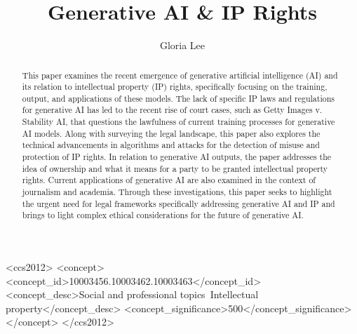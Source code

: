 \documentclass[manuscript,screen]{acmart}
\begin{document}
\title{Generative AI \& IP Rights}

\author{Gloria Lee}


\renewcommand{\shortauthors}{Lee}

\begin{abstract}
  This paper examines the recent emergence of generative artificial intelligence (AI) and its relation to intellectual property (IP) rights, specifically focusing on the training, output, and applications of these models. The lack of specific IP laws and regulations for generative AI has led to the recent rise of court cases, such as Getty Images v. Stability AI, that questions the lawfulness of current training processes for generative AI models. Along with surveying the legal landscape, this paper also explores the technical advancements in algorithms and attacks for the detection of misuse and protection of IP rights. In relation to generative AI outputs, the paper addresses the idea of ownership and what it means for a party to be granted intellectual property rights. Current applications of generative AI are also examined in the context of journalism and academia. Through these investigations, this paper seeks to highlight the urgent need for legal frameworks specifically addressing generative AI and IP and brings to light complex ethical considerations for the future of generative AI. 
\end{abstract}

\begin{CCSXML}
<ccs2012>
  <concept>
  <concept_id>10003456.10003462.10003463</concept_id>
  <concept_desc>Social and professional topics~Intellectual property</concept_desc>
  <concept_significance>500</concept_significance>
  </concept>
</ccs2012>  
\end{CCSXML}
\end{document}
